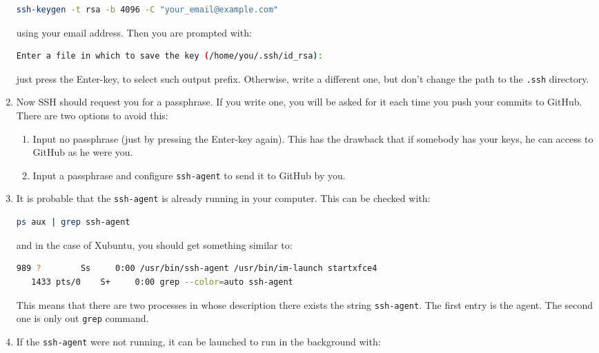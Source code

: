 \begin{enumerate}
  \begin{lstlisting}[language=bash]
    ssh-keygen -t rsa -b 4096 -C "your_email@example.com"
  \end{lstlisting}

  using your email address. Then you are prompted with:

  \begin{lstlisting}[language=bash]
    Enter a file in which to save the key (/home/you/.ssh/id_rsa):
  \end{lstlisting}

  just press the Enter-key, to select such output prefix. Otherwise,
  write a different one, but don't change the path to the
  \texttt{.ssh} directory.

\item Now SSH should request you for a passphrase. If you write one,
  you will be asked for it each time you push your commits to
  GitHub. There are two options to avoid this:

  \begin{enumerate}
  \item Input no passphrase (just by pressing the Enter-key
    again). This has the drawback that if somebody has your keys, he
    can access to GitHub as he were you.
  \item Input a passphrase and configure \texttt{ssh-agent} to send it
    to GitHub by you.
  \end{enumerate}

\item It is probable that the \texttt{ssh-agent} is already
  running in your computer. This can be checked with:

  \begin{lstlisting}[language=bash]
    ps aux | grep ssh-agent
  \end{lstlisting}

  and in the case of Xubuntu, you should get something similar to:

  \begin{lstlisting}[language=bash]
    989 ?        Ss     0:00 /usr/bin/ssh-agent /usr/bin/im-launch startxfce4
   1433 pts/0    S+     0:00 grep --color=auto ssh-agent
  \end{lstlisting}

  This means that there are two processes in whose description there
  exists the string \texttt{ssh-agent}. The first entry is the
  agent. The second one is only out \texttt{grep} command.

\item If the \texttt{ssh-agent} were not running, it can be launched to
  run in the background with:


\end{enumerate}
